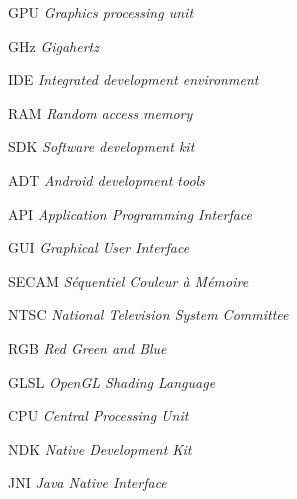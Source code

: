 \begin{siglas}
  \item[GPU] \textit{Graphics processing unit}
  \item[GHz] \textit{Gigahertz}
  \item[IDE] \textit{Integrated development environment}
  \item[RAM] \textit{Random access memory}
  \item[SDK] \textit{Software development kit}
  \item[ADT] \textit{Android development tools}
  \item[API] \textit{Application Programming Interface}
  \item[GUI] \textit{Graphical User Interface}
  \item[SECAM] \textit{Séquentiel Couleur à Mémoire}
  \item[NTSC] \textit{National Television System Committee}
  \item[RGB] \textit{Red Green and Blue}
  \item[GLSL] \textit{OpenGL Shading Language}
  \item[CPU] \textit{Central Processing Unit}
  \item[NDK] \textit{Native Development Kit}
  \item[JNI] \textit{Java Native Interface}	


\end{siglas}
